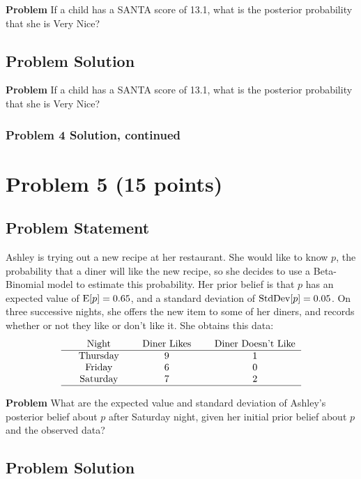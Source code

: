 \documentclass[12pt]{article}
\theoremstyle{definition}
\begin{document}
\bigskip
\noindent
{\bf Problem} If a child has a SANTA score of 13.1, what is the posterior probability that she is Very Nice?




\subsection*{Problem Solution}

\noindent
{\bf Problem} If a child has a SANTA score of 13.1, what is the posterior probability that she is Very Nice?
	
\newpage
\subsubsection*{Problem 4 Solution, continued}


\newpage
\section*{Problem 5 (15 points)}

\subsection*{Problem Statement}

Ashley is trying out a new recipe at her restaurant. She would like to know $p$, the probability that a diner will like the new recipe, so she decides to use a Beta-Binomial model to estimate this probability. Her prior belief is that $p$ has an expected value of $\hbox{E}[p] = 0.65$, and a standard deviation of $\hbox{StdDev}[p] = 0.05$. On three successive nights, she offers the new item to some of her diners, and records whether or not they like or don't like it. She obtains this data:
$$
\begin{tabular}{ccccccc}
& Night & & Diner Likes & & Diner Doesn't Like\\
\hline
& Thursday & & 9 & & 1\\
& Friday & & 6 & & 0\\
& Saturday & & 7 & & 2\\
\hline
\end{tabular}
$$

\bigskip
\noindent
{\bf Problem} What are the expected value and standard deviation of Ashley's posterior belief about $p$ after Saturday night, given her initial prior belief about $p$ and the observed data?




\subsection*{Problem Solution}
\end{document}
